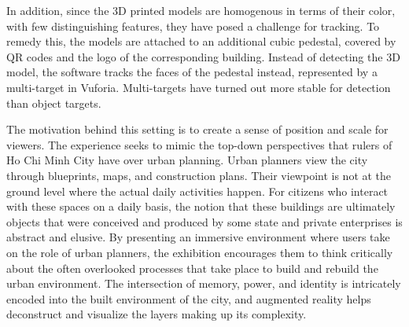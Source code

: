 In addition, since the 3D printed models are homogenous in terms of their color, with few distinguishing features, they have posed a challenge for tracking. To remedy this, the models are attached to an additional cubic pedestal, covered by QR codes and the logo of the corresponding building. Instead of detecting the 3D model, the software tracks the faces of the pedestal instead, represented by a multi-target in Vuforia. Multi-targets have turned out more stable for detection than object targets.

The motivation behind this setting is to create a sense of position and scale for viewers. The experience seeks to mimic the top-down perspectives that rulers of Ho Chi Minh City have over urban planning. Urban planners view the city through blueprints, maps, and construction plans. Their viewpoint is not at the ground level where the actual daily activities happen. For citizens who interact with these spaces on a daily basis, the notion that these buildings are ultimately objects that were conceived and produced by some state and private enterprises is abstract and elusive. By presenting an immersive environment where users take on the role of urban planners, the exhibition encourages them to think critically about the often overlooked processes that take place to build and rebuild the urban environment. The intersection of memory, power, and identity is intricately encoded into the built environment of the city, and augmented reality helps deconstruct and visualize the layers making up its complexity.
\en %
